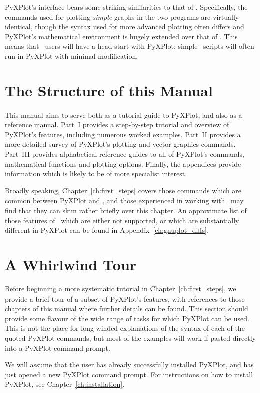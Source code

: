 PyXPlot's interface bears some striking similarities to that of \gnuplot.
Specifically, the commands used for plotting {\it simple} graphs in the two
programs are virtually identical, though the syntax used for more advanced
plotting often differs and PyXPlot's mathematical environment is hugely
extended over that of \gnuplot. This means that \gnuplot\ users will have a
head start with PyXPlot: simple \gnuplot\ scripts will often run in PyXPlot
with minimal modification.

\section{The Structure of this Manual}

This manual aims to serve both as a tutorial guide to PyXPlot, and also as a
reference manual. Part~I provides a step-by-step tutorial and overview of
PyXPlot's features, including numerous worked examples. Part~II provides a more
detailed survey of PyXPlot's plotting and vector graphics commands. Part~III
provides alphabetical reference guides to all of PyXPlot's commands,
mathematical functions and plotting options.  Finally, the appendices provide
information which is likely to be of more specialist interest.

Broadly speaking, Chapter~\ref{ch:first_steps} covers those commands which are
common between PyXPlot and \gnuplot, and those experienced in working with
\gnuplot\ may find that they can skim rather briefly over this chapter. An
approximate list of those features of \gnuplot\ which are either not supported,
or which are substantially different in PyXPlot can be found in
Appendix~\ref{ch:gnuplot_diffs}.

\section{A Whirlwind Tour}

Before beginning a more systematic tutorial in Chapter~\ref{ch:first_steps}, we
provide a brief tour of a subset of PyXPlot's features, with references to
those chapters of this manual where further details can be found. This section
should provide some flavour of the wide range of tasks for which PyXPlot can be
used. This is not the place for long-winded explanations of the syntax of each
of the quoted PyXPlot commands, but most of the examples will work if pasted
directly into a PyXPlot command prompt.

We will assume that the user has already successfully installed PyXPlot, and
has just opened a new PyXPlot command prompt. For instructions on how to
install PyXPlot, see Chapter~\ref{ch:installation}.


